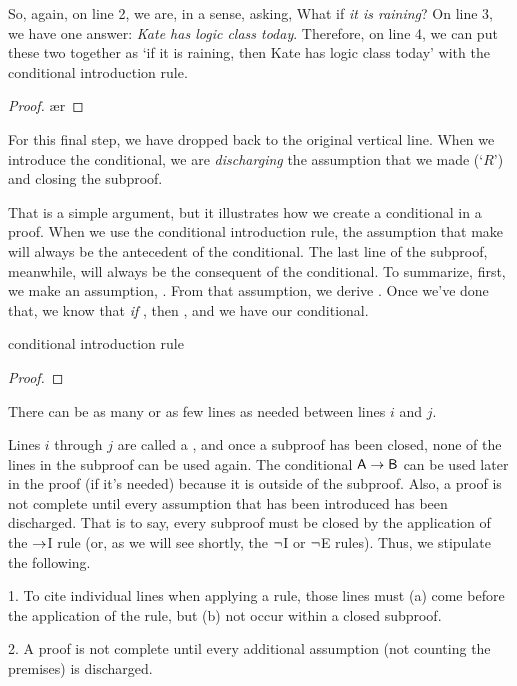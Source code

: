 So, again, on line 2, we are, in a sense, asking, What if \textit{it is raining}? On line 3, we have one answer: \textit{Kate has logic class today}. Therefore, on line 4, we can put these two together as `if it is raining, then Kate has logic class today' with the conditional introduction rule.
	\begin{proof}
		 \pr{}
		\open
			 \as{}
			\ae{r}
			\close
	\end{proof}
For this final step, we have dropped back to the original vertical line. When we introduce the conditional, we are \emph{discharging} the assumption that we made (`$R$') and closing the subproof.

That is a simple argument, but it illustrates how we create a conditional in a proof. When we use the conditional introduction rule, the assumption that make will always be the antecedent of the conditional. The last line of the subproof, meanwhile, will always be the consequent of the conditional. 
To summarize, first, we make an assumption, . From that assumption, we derive . Once we've done that, we know that \textit{if} , then , and we have our conditional. 
\begin{factboxy}{conditional introduction rule}
	\begin{proof}
		\open
			 \as{}
		\close
	\end{proof}
\footnotesize{There can be as many or as few lines as needed between lines $i$ and $j$.} 
\end{factboxy}

Lines $i$ through $j$ are called a , and once a subproof has been closed, none of the lines in the subproof can be used again. The conditional $\mathsf{A}\rightarrow\mathsf{B}$ can be used later in the proof (if it's needed) because it is outside of the subproof. Also, a proof is not complete until every assumption that has been introduced has been discharged. That is to say, every subproof must be closed by the application of the $\rightarrow$I rule (or, as we will see shortly, the ${\neg}$I or ${\neg}$E rules).
Thus, we stipulate the following.
\begin{earg}
\item[1.] To cite individual lines when applying a rule, those lines must (a) come before the application of the rule, but (b) not occur within a closed subproof.
\item[2.] A proof is not complete until every additional assumption (not counting the premises) is discharged.
\end{earg}


